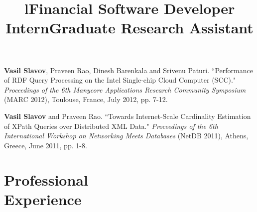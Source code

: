 \documentclass[margin,line]{resume}
\begin{document}
\begin{resume}
\vspace{-2mm}
    \textbf{Vasil Slavov}, Praveen Rao, Dinesh Barenkala and Srivenu Paturi.
    ``Performance of RDF Query Processing on the Intel Single-chip Cloud Computer (SCC)."
    \textsl{Proceedings of the 6th Manycore Applications Research Community Symposium} (MARC 2012), Toulouse, France, July 2012, pp. 7-12.
    
\vspace{-2mm}
    \textbf{Vasil Slavov} and Praveen Rao.
    ``Towards Internet-Scale Cardinality Estimation of XPath Queries over Distributed XML Data."
    \textsl{Proceedings of the 6th International Workshop on Networking Meets Databases} (NetDB 2011), Athens, Greece, June 2011, pp. 1-8.

        
    \section{\mysidestyle Professional\\Experience}
    
    \begin{format}
    \title{l}\\
    \\
    \end{format}

    \title{\textbf{Financial Software Developer Intern}}
    \begin{position}\end{position}
    
    \title{\textbf{Graduate Research Assistant}}
    \begin{position}\end{position}
    

\end{resume}
\end{document}
